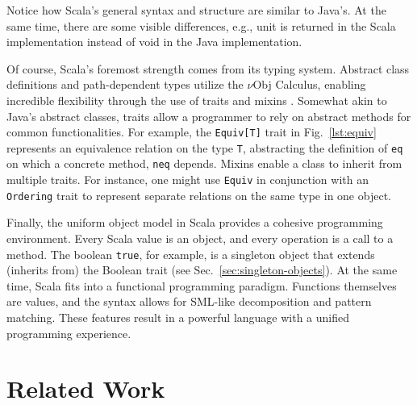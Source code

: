 \documentclass[jou,apacite]{IEEEtran}
\begin{document}
\begin{listing}
  \centering
  \inputminted[frame=single]{Java}{../examples/PrintExample.java}
  \inputminted[frame=single]{Scala}{../examples/PrintExample.scala}
  \caption{Notice how Scala's general syntax and structure are similar
    to Java's. At the same time, there are some visible differences, e.g., unit
    is returned in the Scala implementation instead of void in the Java
    implementation.}
  \label{lst:print}
\end{listing}

Of course, Scala's foremost strength comes from its typing system. Abstract
class definitions and path-dependent types utilize the $\nu$Obj Calculus,
enabling incredible flexibility through the use of traits and mixins
\cite{odersky_nominal_2003}. Somewhat akin to Java's abstract classes, traits
allow a programmer to rely on abstract methods for common functionalities. For
example, the \texttt{Equiv[T]} trait in Fig.~\ref{lst:equiv} represents an
equivalence relation on the type \texttt{T}, abstracting the definition of
\texttt{eq} on which a concrete method, \texttt{neq} depends. Mixins enable a
class to inherit from multiple traits. For instance, one might use
\texttt{Equiv} in conjunction with an \texttt{Ordering} trait to represent
separate relations on the same type in one object.

Finally, the uniform object model in Scala provides a cohesive programming
environment. Every Scala value is an object, and every operation is a call to a
method. The boolean \texttt{true}, for example, is a singleton object that
extends (inherits from) the Boolean trait (see
Sec.~\ref{sec:singleton-objects}). At the same time, Scala fits into a
functional programming paradigm. Functions themselves are values, and the syntax
allows for SML-like decomposition and pattern matching. These features result in
a powerful language with a unified programming experience.

\section{Related Work}
\label{sec:related-work}
\end{document}

